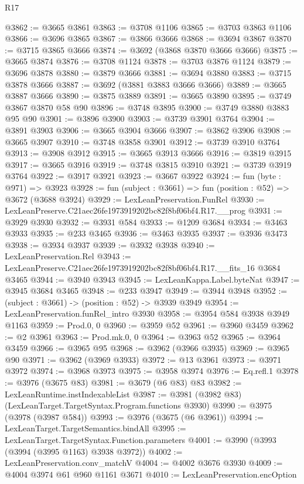 \begin{lexlean}{R17}
\begin{coremodule}
@3862 := @3665 @3861
@3863 := @3708 @1106
@3865 := @3703 @3863 @1106
@3866 := @3696 @3865
@3867 := @3866 @3666
@3868 := @3694 @3867
@3870 := @3715 @3865 @3666
@3874 := @3692 (@3868 @3870 @3666 @3666)
@3875 := @3665 @3874
@3876 := @3708 @1124
@3878 := @3703 @3876 @1124
@3879 := @3696 @3878
@3880 := @3879 @3666
@3881 := @3694 @3880
@3883 := @3715 @3878 @3666
@3887 := @3692 (@3881 @3883 @3666 @3666)
@3889 := @3665 @3887 @3666
@3890 := @3875 @3889
@3891 := @3665 @3890
@3895 := @3749 @3867 @3870 @58 @90
@3896 := @3748 @3895
@3900 := @3749 @3880 @3883 @95 @90
@3901 := @3896 @3900
@3903 := @3739 @3901 @3764
@3904 := @3891 @3903
@3906 := @3665 @3904 @3666
@3907 := @3862 @3906
@3908 := @3665 @3907
@3910 := @3748 @3858 @3901
@3912 := @3739 @3910 @3764
@3913 := @3908 @3912
@3915 := @3665 @3913 @3666
@3916 := @3819 @3915
@3917 := @3665 @3916
@3919 := @3748 @3815 @3910
@3921 := @3739 @3919 @3764
@3922 := @3917 @3921
@3923 := @3667 @3922
@3924 := fun (byte : @971) => @3923
@3928 := fun (subject : @3661) => fun (position : @52) => @3672 (@3688 @3924)
@3929 := LexLeanPreservation.FunRel
@3930 := LexLeanPreserve.C21aec26fe1973919202bc82f8bf06bf4.R17.__prog
@3931 := @3929 @3930
@3932 := @3931 @584
@3933 := @1209 @3684
@3934 := @3463 @3933
@3935 := @233 @3465
@3936 := @3463 @3935
@3937 := @3936 @3473
@3938 := @3934 @3937
@3939 := @3932 @3938
@3940 := LexLeanPreservation.Rel
@3943 := LexLeanPreserve.C21aec26fe1973919202bc82f8bf06bf4.R17.__fits_16 @3684 @3465
@3944 := @3940 @3943
@3945 := LexLeanKappa.Label.byteNat
@3947 := @3945 @3684 @3465
@3948 := @233 @3947
@3949 := @3944 @3948
@3952 := (subject : @3661) -> (position : @52) -> @3939 @3949
@3954 := LexLeanPreservation.funRel_intro @3930
@3958 := @3954 @584 @3938 @3949 @1163
@3959 := Prod.{0, 0}
@3960 := @3959 @52
@3961 := @3960 @3459
@3962 := @2 @3961
@3963 := Prod.mk.{0, 0}
@3964 := @3963 @52
@3965 := @3964 @3459
@3966 := @3965 @95
@3968 := @3962 (@3966 @3935)
@3969 := @3965 @90
@3971 := @3962 (@3969 @3933)
@3972 := @13 @3961
@3973 := @3971 @3972
@3974 := @3968 @3973
@3975 := @3958 @3974
@3976 := Eq.refl.{1}
@3978 := @3976 (@3675 @83)
@3981 := @3679 (@6 @83) @83
@3982 := LexLeanRuntime.instIndexableList
@3987 := @3981 (@3982 @83) (LexLeanTarget.TargetSyntax.Program.functions @3930)
@3990 := @3975 (@3978 (@3987 @584))
@3993 := @3976 (@3675 (@6 @3961))
@3994 := LexLeanTarget.TargetSemantics.bindAll
@3995 := LexLeanTarget.TargetSyntax.Function.parameters
@4001 := @3990 (@3993 (@3994 (@3995 @1163) @3938 @3972))
@4002 := LexLeanPreservation.conv_matchV
@4004 := @4002 @3676 @3930
@4009 := @4004 @3974 @61 @960 @1161 @3671
@4010 := LexLeanPreservation.encOption

\end{coremodule}
\end{lexlean}
